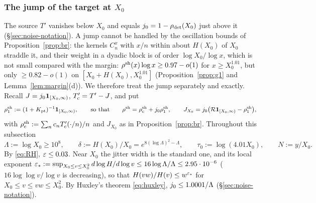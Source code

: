 \subsubsection{The jump of the target at $X_0$}\label{sec:x0band}

The source $T'$ vanishes below $X_0$ and equals $j_0=1-\rho_{\mathrm{det}}(X_0)$ just above it (\S\ref{sec:noise-notation}). A jump
cannot be handled by the oscillation bounds of Proposition~\ref{prop:br}: the kernels $C_n^x$ with $x/n$ within about
$H(X_0)$ of $X_0$ straddle it, and their weight in a dyadic block is of order $\log X_0/\log x$, which is not small
compared with the margin: $\rho^{\mathrm{sh}}(x)\log x\ge0.97-o(1)$ for $x\ge X_0^{1.01}$, but only $\ge0.82-o(1)$ on
$[X_0+H(X_0),X_0^{1.01}]$ (Proposition~\ref{prop:g1} and Lemma~\ref{lem:margin}(d)).
We therefore treat the jump separately and exactly. Recall
$J=j_0\mathbf 1_{[X_0,\infty)}$, $T'_{\mathrm{c}}=T'-J$, and put
\[
  \rho^{\mathrm{sh}}_1:=(1+K_{\mathrm{pt}})^{-1}\mathbf 1_{[X_0,\infty)},\qquad\text{so that}\qquad \rho^{\mathrm{sh}}=\rho^{\mathrm{sh}}_{\mathrm c}+j_0\rho^{\mathrm{sh}}_1,
  \qquad J_{X_0}=j_0\bigl(\mathcal{R}\mathbf 1_{[X_0,\infty)}-\rho^{\mathrm{sh}}_1\bigr),
\]
with $\rho^{\mathrm{sh}}_{\mathrm c}:=\sum_n c_nT'_{\mathrm{c}}(\cdot/n)/n$ and $J_{X_0}$ as in Proposition~\ref{prop:br}. Throughout this
subsection
\[
  \Lambda:=\log X_0\ge10^8,\qquad \delta:=H(X_0)/X_0=e^{8(\log\Lambda)^2-\Lambda},\qquad \tau_0:=\log(4.01X_0),\qquad N:=y/X_0 .
\]
By \eqref{eq:RH}, $\varepsilon\le0.03$. Near $X_0$ the jitter width is the standard one, and its local exponent
$\varepsilon_*:=\sup_{X_0\le v\le X_0^2}d\log H/d\log v\le16\log\Lambda/\Lambda\le2.95\cdot10^{-6}$ ($16\log\log v/\log v$ is decreasing), so that
$H(vw)/H(v)\le w^{\varepsilon_*}$ for $X_0\le v\le vw\le X_0^2$. By Huxley's theorem \eqref{eq:huxley}, $j_0\le1.0001/\Lambda$
(\S\ref{sec:noise-notation}).


